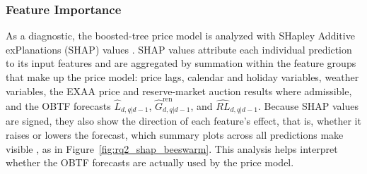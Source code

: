 \subsubsection{Feature Importance}
\label{sec:feature_importance}

As a diagnostic, the boosted-tree price model is analyzed with SHapley Additive exPlanations (SHAP) values
\cite{lundberg2017shap,lundberg2020treeshap}. SHAP values attribute each individual prediction to
its input features and are aggregated by summation within the feature groups
that make up the price model: price lags, calendar and holiday variables,
weather variables, the EXAA price and reserve-market auction results where
admissible, and the OBTF forecasts
\(\hat{L}_{d,q|d-1}\), \(\hat{G}^{\mathrm{ren}}_{d,q|d-1}\), and
\(\widehat{RL}_{d,q|d-1}\). Because SHAP values are signed, they also show the
direction of each feature's effect, that is, whether it raises or lowers the
forecast, which summary plots across all predictions make visible
\cite{lundberg2017shap,lundberg2020treeshap}, as in
Figure~\ref{fig:rq2_shap_beeswarm}. This analysis helps interpret whether the OBTF forecasts are actually
used by the price model.
